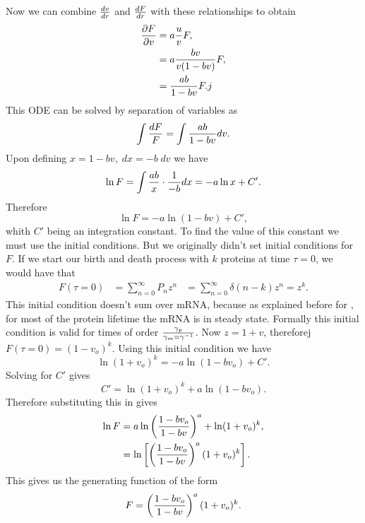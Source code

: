 Now we can combine ${dv \over dr}$ and ${dF \over dr}$ with these relationships
to obtain
\begin{align}
  {\partial F \over \partial v} &= a {u \over v} F, \\
  &= a {b v \over v (1 - b v)} F, \\
  &= {a b \over 1 - b v} F.j
\end{align}
This ODE can be solved by separation of variables as
\begin{equation}
  \int {dF \over F} = \int {a b \over 1 - b v} dv.
\end{equation}
Upon defining $x = 1 - b v, \; dx = - b\; dv$ we have
\begin{equation}
  \ln F = \int {a b \over x} \cdot {1 \over -b} dx = -a \ln x + C'.
\end{equation}
Therefore
\begin{equation}
  \ln F = -a \ln (1 - b v) + C',
  \label{eq_lnF_constant}
\end{equation}
whith $C'$ being an integration constant. To find the value of this constant
we must use the initial conditions. But we originally didn't set initial
conditions for $F$. If we start our birth and death process with $k$ proteins
at time $\tau = 0$, we would have that
\begin{align}
  F(\tau = 0) &= \sum_{n=0}^{\infty}P_n z^n
  &= \sum_{n=0}^{\infty} \delta (n - k) z^n = z^k.
\end{align}
This initial condition doesn't sum over mRNA, because as explained before for
\eref[eq_SI_31_uofv], for most of the protein lifetime the mRNA is in steady
state. Formally this initial condition is valid for times of order
${\gamma_p \over \gamma_m = \gamma^{-1}}$. Now $z = 1 + v$, thereforej
$F(\tau = 0) = (1 - v_o)^k$. Using this initial condition we have
\begin{equation}
  \ln (1 + v_o)^k = -a \ln (1 - b v_o) + C'.
\end{equation}
Solving for $C'$ gives
\begin{equation}
  C' = \ln (1 + v_o)^k + a \ln (1 - b v_o).
\end{equation}
Therefore substituting this in  gives
\begin{align}
  \ln F &= a \ln \left( {1 - b v_o \over 1 - b v} \right)^a
  + \ln (1 + v_o)^k,\\
  &= \ln \left[ \left( {1 - b v_o \over 1 - b v} \right)^a
  (1 + v_o)^k \right].
\end{align}
This gives us the generating function of the form
\begin{equation}
  F =   \left( {1 - b v_o \over 1 - b v} \right)^a
  (1 + v_o)^k .
  \label{eq_generating_function_onv}
\end{equation}

